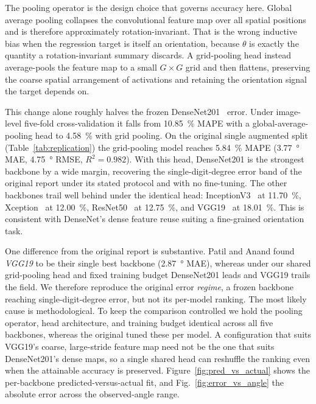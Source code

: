 The pooling operator is the design choice that governs accuracy here. Global average pooling collapses the convolutional feature map over all spatial positions and is therefore approximately rotation-invariant. That is the wrong inductive bias when the regression target is itself an orientation, because $\theta$ is exactly the quantity a rotation-invariant summary discards. A grid-pooling head instead average-pools the feature map to a small $G\times G$ grid and then flattens, preserving the coarse spatial arrangement of activations and retaining the orientation signal the target depends on.

This change alone roughly halves the frozen DenseNet201~\citep{Huang2017} error. Under image-level five-fold cross-validation it falls from \SI{10.85}{\percent} MAPE with a global-average-pooling head to \SI{4.58}{\percent} with grid pooling. On the original single augmented split (Table~\ref{tab:replication}) the grid-pooling model reaches \SI{5.84}{\percent} MAPE (\SI{3.77}{\degree} MAE, \SI{4.75}{\degree} RMSE, $R^2=0.982$). With this head, DenseNet201 is the strongest backbone by a wide margin, recovering the single-digit-degree error band of the original report under its stated protocol and with no fine-tuning. The other backbones trail well behind under the identical head: InceptionV3~\citep{Szegedy2016} at \SI{11.70}{\percent}, Xception~\citep{Chollet2017} at \SI{12.00}{\percent}, ResNet50~\citep{He2016} at \SI{12.75}{\percent}, and VGG19~\citep{Simonyan2015} at \SI{18.01}{\percent}. This is consistent with DenseNet's dense feature reuse suiting a fine-grained orientation task.

One difference from the original report is substantive. Patil and Anand found \emph{VGG19} to be their single best backbone (\SI{2.87}{\degree} MAE), whereas under our shared grid-pooling head and fixed training budget DenseNet201 leads and VGG19 trails the field. We therefore reproduce the original error \emph{regime}, a frozen backbone reaching single-digit-degree error, but not its per-model ranking. The most likely cause is methodological. To keep the comparison controlled we hold the pooling operator, head architecture, and training budget identical across all five backbones, whereas the original tuned these per model. A configuration that suits VGG19's coarse, large-stride feature map need not be the one that suits DenseNet201's dense maps, so a single shared head can reshuffle the ranking even when the attainable accuracy is preserved. Figure~\ref{fig:pred_vs_actual} shows the per-backbone predicted-versus-actual fit, and Fig.~\ref{fig:error_vs_angle} the absolute error across the observed-angle range.

